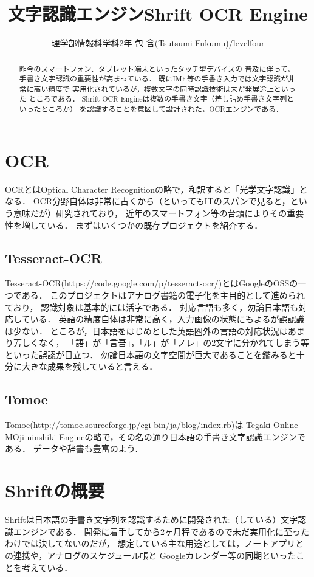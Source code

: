 \documentclass[11pt, a4paper]{jsarticle}
\title{文字認識エンジンShrift OCR Engine}
\author{理学部情報科学科2年 包 含(Tsutsumi Fukumu)/levelfour}
\date{}
\begin{document}
\maketitle

\begin{abstract}
	昨今のスマートフォン、タブレット端末といったタッチ型デバイスの
	普及に伴って，手書き文字認識の重要性が高まっている．
	既にIME等の手書き入力では文字認識が非常に高い精度で
	実用化されているが，複数文字の同時認識技術は未だ発展途上といった
	ところである．
	Shrift OCR Engineは複数の手書き文字（差し詰め手書き文字列といったところか）
	を認識することを意図して設計された，OCRエンジンである．
\end{abstract}

\section{OCR}
OCRとはOptical Character Recognitionの略で，和訳すると「光学文字認識」となる．
OCR分野自体は非常に古くから（といってもITのスパンで見ると，という意味だが）研究されており，
近年のスマートフォン等の台頭によりその重要性を増している．
まずはいくつかの既存プロジェクトを紹介する．

\subsection{Tesseract-OCR}
Tesseract-OCR(https://code.google.com/p/tesseract-ocr/)とはGoogleのOSSの一つである．
このプロジェクトはアナログ書籍の電子化を主目的として進められており，
認識対象は基本的には活字である．
対応言語も多く，勿論日本語も対応している．
英語の精度自体は非常に高く，入力画像の状態にもよるが誤認識は少ない．
ところが，日本語をはじめとした英語圏外の言語の対応状況はあまり芳しくなく，
「語」が「言吾」，「ル」が「ノレ」の2文字に分かれてしまう等といった誤認が目立つ．
勿論日本語の文字空間が巨大であることを鑑みると十分に大きな成果を残していると言える．

\subsection{Tomoe}
Tomoe(http://tomoe.sourceforge.jp/cgi-bin/ja/blog/index.rb)は
Tegaki Online MOji-ninshiki Engineの略で，その名の通り日本語の手書き文字認識エンジンである．
データや辞書も豊富のよう．

\section{Shriftの概要}
Shriftは日本語の手書き文字列を認識するために開発された（している）文字認識エンジンである．
開発に着手してから2ヶ月程であるので未だ実用化に至ったわけでは決してないのだが，
想定している主な用途としては，ノートアプリとの連携や，アナログのスケジュール帳と
Googleカレンダー等の同期といったことを考えている．
\end{document}
